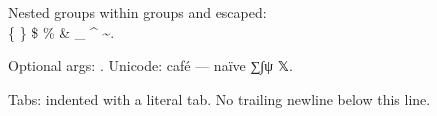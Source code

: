 \makeatletter
\def\foo@bar{x}
\makeatother

Nested {groups {within {groups}}} and escaped: \\ \{ \} \$ \% \& \_ \^{} \~{}.

Optional args: . Unicode: café — naïve ∑∫ψ 𝕏.

Tabs:	indented with a literal tab.
No trailing newline below this line.